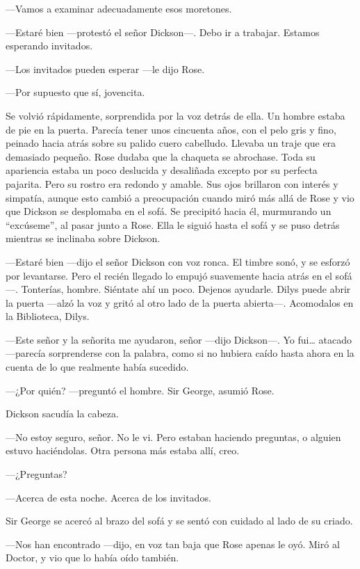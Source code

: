 {---Vamos a examinar adecuadamente esos moretones.}

{---Estaré bien ---protestó el señor Dickson---. Debo ir a trabajar.
Estamos esperando invitados.}

{---Los invitados pueden esperar ---le dijo Rose.}

{---Por supuesto que sí, jovencita.}

{Se volvió rápidamente, sorprendida por la voz detrás de ella. Un hombre
estaba de pie en la puerta. Parecía tener unos cincuenta años, con el
pelo gris y fino, peinado hacia atrás sobre su palido cuero cabelludo.
Llevaba un traje que era demasiado pequeño. Rose dudaba que la chaqueta
se abrochase. Toda su apariencia estaba un poco deslucida y desaliñada
excepto por su perfecta pajarita. Pero su rostro era redondo y amable.
Sus ojos brillaron con interés y simpatía, aunque esto cambió a
preocupación cuando miró más allá de Rose y vio que Dickson se
desplomaba en el sofá. Se precipitó hacia él, murmurando un
``excúseme'', al pasar junto a Rose. Ella le siguió hasta el sofá y se
puso detrás mientras se inclinaba sobre Dickson.}

{---Estaré bien ---dijo el señor Dickson con voz ronca. El timbre sonó,
y se esforzó por levantarse. Pero el recién llegado lo empujó suavemente
hacia atrás en el sofá---. Tonterías, hombre. Siéntate ahí un poco.
Dejenos ayudarle. Dilys puede abrir la puerta ---alzó la voz y gritó al
otro lado de la puerta abierta---. Acomodalos en la Biblioteca, Dilys.}

{---Este señor y la señorita me ayudaron, señor ---dijo Dickson---. Yo
fui\ldots{} atacado ---parecía sorprenderse con la palabra, como si no
hubiera caído hasta ahora en la cuenta de lo que realmente había
sucedido.}

{---¿Por quién? ---preguntó el hombre. Sir George, asumió Rose.}

{Dickson sacudía la cabeza.}

{---No estoy seguro, señor. No le vi. Pero estaban haciendo preguntas, o
alguien estuvo haciéndolas. Otra persona más estaba allí, creo.}

{---¿Preguntas?}

{---Acerca de esta noche. Acerca de los invitados.}

{Sir George se acercó al brazo del sofá y se sentó con cuidado al lado
de su criado.}

{---Nos han encontrado ---dijo, en voz tan baja que Rose apenas le oyó.
Miró al Doctor, y vio que lo había oído también.}

